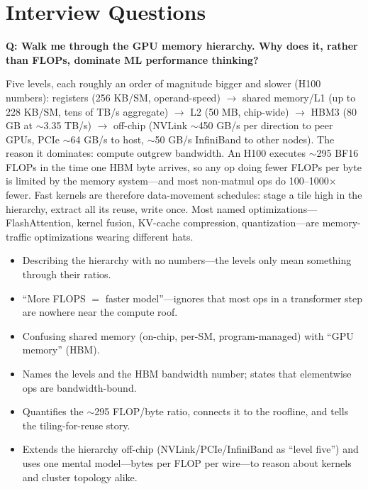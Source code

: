 \section{Interview Questions}
\label{sec:gpu_interview}

\begin{interviewq}
\textbf{Q: Walk me through the GPU memory hierarchy. Why does it, rather than FLOPs, dominate ML performance thinking?}

 \quad {} \quad \badgefreq{\freqmed}

\stronganswer Five levels, each roughly an order of magnitude bigger and slower (H100 numbers): registers (256 KB/SM, operand-speed) $\to$ shared memory/L1 (up to 228 KB/SM, tens of TB/s aggregate) $\to$ L2 (50 MB, chip-wide) $\to$ HBM3 (80 GB at $\sim$3.35 TB/s) $\to$ off-chip (NVLink $\sim$450 GB/s per direction to peer GPUs, PCIe $\sim$64 GB/s to host, $\sim$50 GB/s InfiniBand to other nodes). The reason it dominates: compute outgrew bandwidth. An H100 executes $\sim$295 BF16 FLOPs in the time one HBM byte arrives, so any op doing fewer FLOPs per byte is limited by the memory system---and most non-matmul ops do 100--1000$\times$ fewer. Fast kernels are therefore data-movement schedules: stage a tile high in the hierarchy, extract all its reuse, write once. Most named optimizations---FlashAttention, kernel fusion, KV-cache compression, quantization---are memory-traffic optimizations wearing different hats.

\redflags
\begin{itemize}
    \item Describing the hierarchy with no numbers---the levels only mean something through their ratios.
    \item ``More FLOPS $=$ faster model''---ignores that most ops in a transformer step are nowhere near the compute roof.
    \item Confusing shared memory (on-chip, per-SM, program-managed) with ``GPU memory'' (HBM).
\end{itemize}

\goodgreat
\begin{itemize}
    \item {} Names the levels and the HBM bandwidth number; states that elementwise ops are bandwidth-bound.
    \item {} Quantifies the $\sim$295 FLOP/byte ratio, connects it to the roofline, and tells the tiling-for-reuse story.
    \item {} Extends the hierarchy off-chip (NVLink/PCIe/InfiniBand as ``level five'') and uses one mental model---bytes per FLOP per wire---to reason about kernels and cluster topology alike.
\end{itemize}

\end{interviewq}

